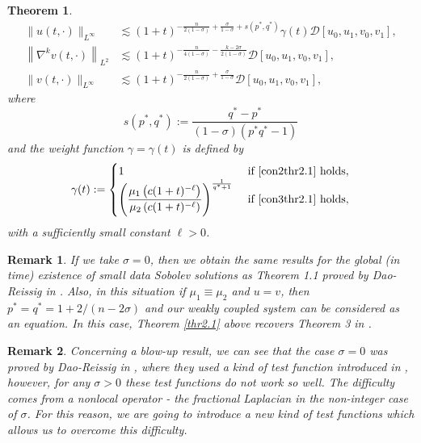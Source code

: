 \documentclass[11pt,reqno]{amsart}
\numberwithin{equation}{section}
\newtheorem{theorem}{Theorem}[section]
\newtheorem{remark}{Remark}[section]
\theoremstyle{plain}
\begin{document}
\begin{theorem}
$$\begin{aligned}
\|u(t,\cdot)\|_{L^{\infty}}&\lesssim (1+t)^{-\frac{n}{2(1-\sigma)}+\frac{\sigma}{1-\sigma}+s(p^*,q^*)}\gamma(t)\mathcal{D}[u_0,u_1,v_0,v_1],\\
\left\|\nabla^{k} v(t, \cdot)\right\|_{L^2}&\lesssim (1+t)^{-\frac{n}{4(1-\sigma)}-\frac{k-2\sigma}{2(1-\sigma)}}\mathcal{D}[u_0,u_1,v_0,v_1],\\
\|v(t,\cdot)\|_{L^{\infty}}&\lesssim (1+t)^{-\frac{n}{2(1-\sigma)}+\frac{\sigma}{1-\sigma}}\mathcal{D}[u_0,u_1,v_0,v_1],
\end{aligned}
$$
where
\begin{equation}\label{con4thr2.1}
s\left(p^*, q^*\right):=\frac{q^*-p^*}{(1-\sigma)(p^* q^*-1)}
\end{equation}
and the weight function $\gamma=\gamma(t)$ is defined by
\begin{equation}\label{con5thr2.1}
\gamma(t):= \begin{cases}
1 & \text { if \eqref{con2thr2.1} holds}, \\
\left(\dfrac{\mu_1\left(c(1+t)^{-\ell}\right)}{\mu_2\left(c(1+t)^{-\ell}\right)}\right)^{\frac{1}{q^*+1}} & \text { if \eqref{con3thr2.1} holds},
\end{cases}
\end{equation}
with a sufficiently small constant $\ell>0$. 
\end{theorem}

\begin{remark}
{\rm
If we take $\sigma=0$, then we obtain the same results for the global (in time) existence of small data Sobolev solutions as Theorem 1.1 proved by Dao-Reissig in \cite{AnhRei2021}. Also, in this situation if $\mu_1\equiv\mu_2$ and $u=v$, then $p^*=q^*=1+2/(n-2\sigma)$ and our weakly coupled system can be considered as an equation. In this case, Theorem \ref{thr2.1} above recovers Theorem 3 in \cite{EbeGirRei2020}. 
}
\end{remark}
\begin{remark}
{\rm
Concerning a blow-up result, we can see that the case $\sigma=0$ was proved by Dao-Reissig in \cite{AnhRei2021}, where they used a kind of test function introduced in \cite{Ikeda2019}, however, for any $\sigma>0$ these test functions do not work so well. The difficulty comes from a nonlocal operator - the fractional Laplacian in the non-integer case of $\sigma$. For this reason, we are going to introduce a new kind of test functions which allows us to overcome this difficulty.}
\end{remark}
\end{document}

